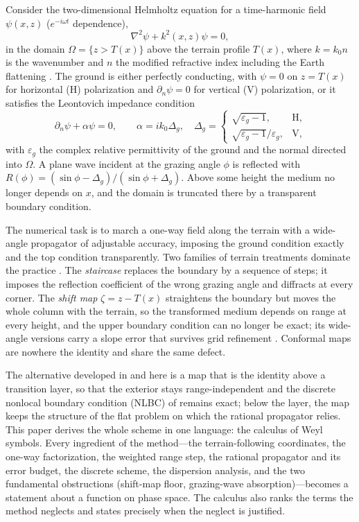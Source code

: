 \documentclass[11pt]{article}
\newcommand{\pd}{\partial}
\begin{document}
Consider the two-dimensional Helmholtz equation for a time-harmonic field
$\psi(x,z)$ ($e^{-i\omega t}$ dependence),
\begin{equation}\label{eq:helmholtz}
\nabla^2\psi+k^2(x,z)\psi=0 ,
\end{equation}
in the domain $\Omega=\{z>T(x)\}$ above the terrain profile $T(x)$, where $k=k_0n$
is the wavenumber and $n$ the modified refractive index including the Earth
flattening \cite{levy2000book}. The ground is either perfectly conducting,
with $\psi=0$ on $z=T(x)$ for horizontal (H) polarization and $\pd_n\psi=0$
for vertical (V) polarization, or it satisfies the Leontovich impedance
condition
\begin{equation}\label{eq:leontovich}
\pd_n\psi+\alpha\psi=0,\qquad \alpha=ik_0\Delta_g,\quad
\Delta_g=\begin{cases}\sqrt{\varepsilon_g-1}, & \text{H},\\
\sqrt{\varepsilon_g-1}/\varepsilon_g, & \text{V},\end{cases}
\end{equation}
with $\varepsilon_g$ the complex relative permittivity of the ground and the
normal directed into $\Omega$. A plane wave incident at the grazing angle
$\phi$ is reflected with $R(\phi)=(\sin\phi-\Delta_g)/(\sin\phi+\Delta_g)$.
Above some height the medium no longer depends on $x$, and the domain is
truncated there by a transparent boundary condition.

The numerical task is to march a one-way field along the terrain with a
wide-angle propagator of adjustable accuracy, imposing the ground condition
exactly and the top condition transparently. Two families of terrain
treatments dominate the practice \cite{beilis1979coupled,barrios1994tpem,donohue2000gtpe,holm2007wasm}.
The \emph{staircase} replaces the boundary by a sequence of steps; it imposes
the reflection coefficient of the wrong grazing angle and diffracts at every
corner. The \emph{shift map} $\zeta=z-T(x)$ straightens the boundary but moves
the whole column with the terrain, so the transformed medium depends on range
at every height, and the upper boundary condition can no longer be exact; its
wide-angle versions carry a slope error that survives grid refinement
\cite{wang2020smpe,zhou2017lfhighangle,gilbert2022wabt}. Conformal maps are
nowhere the identity and share the same defect.

The alternative developed in \cite{lytaev2020awpl,lytaev2018awpl} and here is
a map that is the identity above a transition layer, so that the exterior
stays range-independent and the discrete nonlocal boundary condition (NLBC)
of \cite{lytaev2018awpl} remains exact; below the layer, the map keeps the
structure of the flat problem on which the rational propagator relies. This
paper derives the whole scheme in one language: the calculus of Weyl symbols.
Every ingredient of the method---the terrain-following coordinates, the
one-way factorization, the weighted range step, the rational propagator and
its error budget, the discrete scheme, the dispersion analysis, and the two
fundamental obstructions (shift-map floor, grazing-wave absorption)---becomes
a statement about a function on phase space. The calculus also ranks the
terms the method neglects and states precisely when the neglect is justified.
\end{document}
